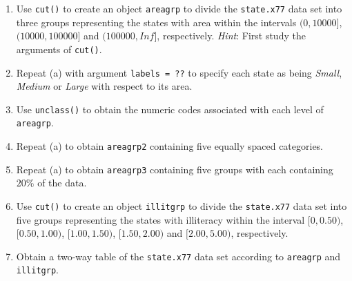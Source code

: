 \documentclass[
]{book}
\begin{document}
\begin{enumerate}
\def\labelenumi{(\alph{enumi})}
\item
  Use \texttt{cut()} to create an object \texttt{areagrp} to divide the \texttt{state.x77} data set into three groups representing the states with area within the intervals \((0, 10 000]\),\((10 000, 100 000]\) and \((100 000, Inf]\), respectively. \emph{Hint}: First study the arguments of \texttt{cut()}.
\item
  Repeat (a) with argument \texttt{labels\ =\ ??} to specify each state as being \emph{Small}, \emph{Medium} or \emph{Large} with respect to its area.
\item
  Use \texttt{unclass()} to obtain the numeric codes associated with each level of \texttt{areagrp}.
\item
  Repeat (a) to obtain \texttt{areagrp2} containing five equally spaced categories.
\item
  Repeat (a) to obtain \texttt{areagrp3} containing five groups with each containing \(20\%\) of the data.
\item
  Use \texttt{cut()} to create an object \texttt{illitgrp} to divide the \texttt{state.x77} data set into five groups representing the states with illiteracy within the interval \([0, 0.50)\), \([0.50, 1.00)\), \([1.00, 1.50)\), \([1.50, 2.00)\) and \([2.00, 5.00)\), respectively.
\item
  Obtain a two-way table of the \texttt{state.x77} data set according to \texttt{areagrp} and \texttt{illitgrp}.
\end{enumerate}
\end{document}
